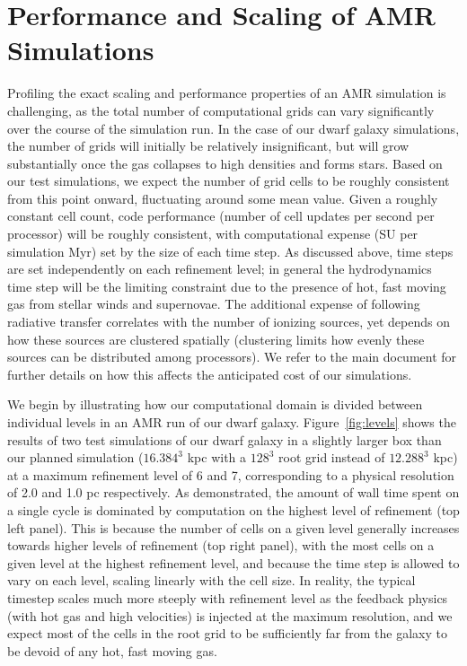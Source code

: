 \documentclass[11pt]{article}
\begin{document}
\section{Performance and Scaling of AMR Simulations}

Profiling the exact scaling and performance properties of an AMR simulation is challenging, as the total number of computational grids can vary significantly over the course of the simulation run. In the case of our dwarf galaxy simulations, the number of grids will initially be relatively insignificant, but will grow substantially once the gas collapses to high densities and forms stars. Based on our test simulations, we expect the number of grid cells to be roughly consistent from this point onward, fluctuating around some mean value. Given a roughly constant cell count, code performance (number of cell updates per second per processor) will be roughly consistent, with computational expense (SU per simulation Myr) set by the size of each time step. As discussed above, time steps are set independently on each refinement level; in general the hydrodynamics time step will be the limiting constraint due to the presence of hot, fast moving gas from stellar winds and supernovae. The additional expense of following radiative transfer correlates with the number of ionizing sources, yet depends on how these sources are clustered spatially (clustering limits how evenly these sources can be distributed among processors). We refer to the main document for further details on how this affects the anticipated cost of our simulations.


We begin by illustrating how our computational domain is divided between individual levels in an AMR run of our dwarf galaxy. Figure~\ref{fig:levels} shows the results of two test simulations of our dwarf galaxy in a slightly larger box than our planned simulation ($16.384^3$ kpc with a $128^3$ root grid instead of $12.288^3$ kpc) at a maximum refinement level of 6 and 7, corresponding to a physical resolution of 2.0 and 1.0 pc respectively. As demonstrated, the amount of wall time spent on a single cycle is dominated by computation on the highest level of refinement (top left panel). This is because the number of cells on a given level generally increases towards higher levels of refinement (top right panel), with the most cells on a given level at the highest refinement level, and because the time step is allowed to vary on each level, scaling linearly with the cell size. In reality, the typical timestep scales much more steeply with refinement level as the feedback physics (with hot gas and high velocities) is injected at the maximum resolution, and we expect most of the cells in the root grid to be sufficiently far from the galaxy to be devoid of any hot, fast moving gas. 
\end{document}
